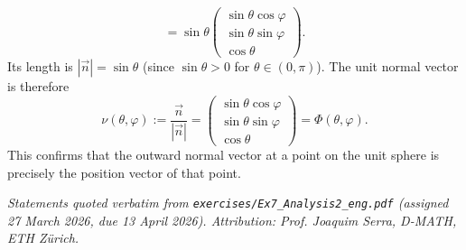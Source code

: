 \begin{example}
\[= \sin\theta \begin{pmatrix} \sin\theta\cos\varphi \\ \sin\theta\sin\varphi \\ \cos\theta \end{pmatrix}.
\]
Its length is $|\vec{n}| = \sin\theta$ (since $\sin\theta > 0$ for $\theta \in (0,\pi)$).
The unit normal vector is therefore
\[
\nu(\theta,\varphi) := \frac{\vec{n}}{|\vec{n}|} = \begin{pmatrix} \sin\theta\cos\varphi \\ \sin\theta\sin\varphi \\ \cos\theta \end{pmatrix} = \Phi(\theta,\varphi).
\]
This confirms that the outward normal vector at a point on the unit sphere is precisely the position vector of that point.
\end{example}

\begin{center}
\end{center}


\textit{Statements quoted verbatim from \texttt{exercises/Ex7\_Analysis2\_eng.pdf} (assigned 27
March 2026, due 13 April 2026). Attribution: Prof. Joaquim Serra, D-MATH, ETH Z\"urich.}

